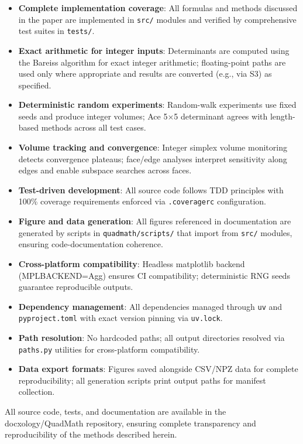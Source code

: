 \documentclass[
  10pt,
]{article}
\newcommand{\passthrough}[1]{#1}
\providecommand{\tightlist}{%
  \setlength{\itemsep}{0pt}\setlength{\parskip}{0pt}}
\begin{document}
\begin{itemize}
\tightlist
\item
  \textbf{Complete implementation coverage}: All formulas and methods
  discussed in the paper are implemented in
  \passthrough{\lstinline!src/!} modules and verified by comprehensive
  test suites in \passthrough{\lstinline!tests/!}.
\item
  \textbf{Exact arithmetic for integer inputs}: Determinants are
  computed using the Bareiss algorithm for exact integer arithmetic;
  floating-point paths are used only where appropriate and results are
  converted (e.g., via S3) as specified.
\item
  \textbf{Deterministic random experiments}: Random-walk experiments use
  fixed seeds and produce integer volumes; Ace 5×5 determinant agrees
  with length-based methods across all test cases.
\item
  \textbf{Volume tracking and convergence}: Integer simplex volume
  monitoring detects convergence plateaus; face/edge analyses interpret
  sensitivity along edges and enable subspace searches across faces.
\item
  \textbf{Test-driven development}: All source code follows TDD
  principles with 100\% coverage requirements enforced via
  \passthrough{\lstinline!.coveragerc!} configuration.
\item
  \textbf{Figure and data generation}: All figures referenced in
  documentation are generated by scripts in
  \passthrough{\lstinline!quadmath/scripts/!} that import from
  \passthrough{\lstinline!src/!} modules, ensuring code-documentation
  coherence.
\item
  \textbf{Cross-platform compatibility}: Headless matplotlib backend
  (MPLBACKEND=Agg) ensures CI compatibility; deterministic RNG seeds
  guarantee reproducible outputs.
\item
  \textbf{Dependency management}: All dependencies managed through
  \passthrough{\lstinline!uv!} and
  \passthrough{\lstinline!pyproject.toml!} with exact version pinning
  via \passthrough{\lstinline!uv.lock!}.
\item
  \textbf{Path resolution}: No hardcoded paths; all output directories
  resolved via \passthrough{\lstinline!paths.py!} utilities for
  cross-platform compatibility.
\item
  \textbf{Data export formats}: Figures saved alongside CSV/NPZ data for
  complete reproducibility; all generation scripts print output paths
  for manifest collection.
\end{itemize}

All source code, tests, and documentation are available in the
docxology/QuadMath repository, ensuring complete transparency and
reproducibility of the methods described herein.
\end{document}
